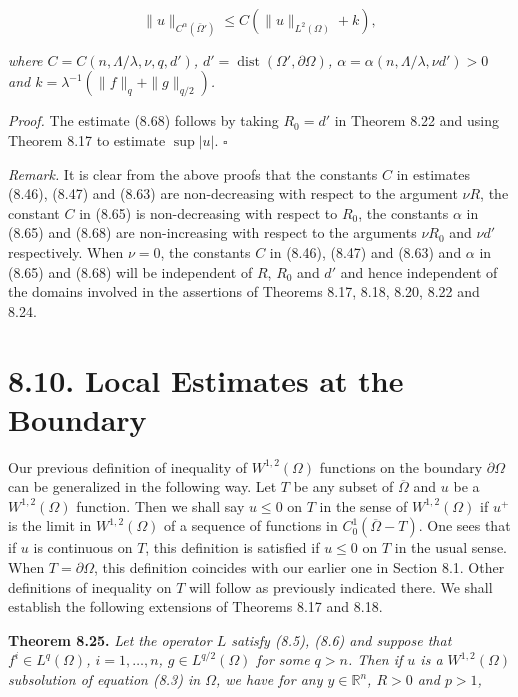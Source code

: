 \begin{equation}
\tag{8.68}
\|u\|_{C^\alpha(\bar\Omega')} \le C(\|u\|_{L^2(\Omega)} + k),
\end{equation}

\textit{where $C = C(n,\Lambda/\lambda,\nu,q,d')$, $d' = \operatorname{dist}(\Omega',\partial\Omega)$, $\alpha = \alpha(n,\Lambda/\lambda,\nu d') > 0$ and $k = \lambda^{-1}(\|f\|_q + \|g\|_{q/2})$.}

\textit{Proof.} The estimate (8.68) follows by taking $R_0 = d'$ in Theorem 8.22 and using Theorem 8.17 to estimate $\sup |u|$. $\square$

\textit{Remark.} It is clear from the above proofs that the constants $C$ in estimates (8.46), (8.47) and (8.63) are non-decreasing with respect to the argument $\nu R$, the constant $C$ in (8.65) is non-decreasing with respect to $R_0$, the constants $\alpha$ in (8.65) and (8.68) are non-increasing with respect to the arguments $\nu R_0$ and $\nu d'$ respectively. When $\nu = 0$, the constants $C$ in (8.46), (8.47) and (8.63) and $\alpha$ in (8.65) and (8.68) will be independent of $R$, $R_0$ and $d'$ and hence independent of the domains involved in the assertions of Theorems 8.17, 8.18, 8.20, 8.22 and 8.24.

\section*{8.10. Local Estimates at the Boundary}

Our previous definition of inequality of $W^{1,2}(\Omega)$ functions on the boundary $\partial\Omega$ can be generalized in the following way. Let $T$ be any subset of $\overline{\Omega}$ and $u$ be a $W^{1,2}(\Omega)$ function. Then we shall say $u \le 0$ on $T$ in the sense of $W^{1,2}(\Omega)$ if $u^+$ is the limit in $W^{1,2}(\Omega)$ of a sequence of functions in $C_0^1(\overline{\Omega} - T)$. One sees that if $u$ is continuous on $T$, this definition is satisfied if $u \le 0$ on $T$ in the usual sense. When $T = \partial\Omega$, this definition coincides with our earlier one in Section 8.1. Other definitions of inequality on $T$ will follow as previously indicated there. We shall establish the following extensions of Theorems 8.17 and 8.18.

\textbf{Theorem 8.25.} \textit{Let the operator $L$ satisfy (8.5), (8.6) and suppose that $f^i \in L^q(\Omega)$, $i = 1,\dots,n$, $g \in L^{q/2}(\Omega)$ for some $q>n$. Then if $u$ is a $W^{1,2}(\Omega)$ subsolution of equation (8.3) in $\Omega$, we have for any $y \in \mathbb{R}^n$, $R>0$ and $p>1$,}

